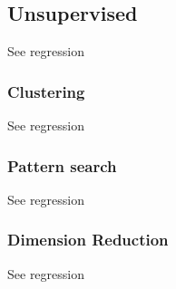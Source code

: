 \subsection{Unsupervised}
See regression


\subsubsection{Clustering}
See regression
 

\subsubsection{Pattern search}
See regression

\subsubsection{Dimension Reduction}
See regression

 


\newpage